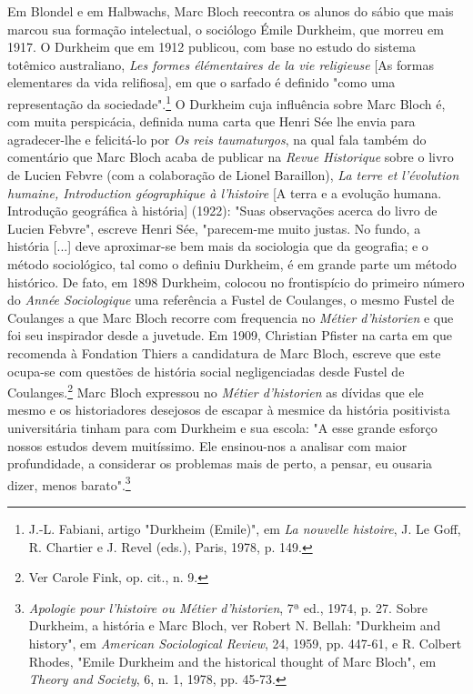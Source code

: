 \documentclass[a5paper]{book}
\begin{document}
Em Blondel e em Halbwachs, Marc Bloch reecontra os alunos do sábio que mais marcou sua formação intelectual, o sociólogo Émile Durkheim, que morreu em 1917. O Durkheim que em 1912 publicou, com base no estudo do sistema totêmico australiano, \textit{Les formes élémentaires de la vie religieuse} [As formas elementares da vida relifiosa], em que o sarfado é definido "como uma representação da sociedade".\footnote{J.-L. Fabiani, artigo "Durkheim (Emile)", em \textit{La nouvelle histoire}, J. Le Goff, R. Chartier e J. Revel (eds.), Paris, 1978, p. 149.} O Durkheim cuja influência sobre Marc Bloch é, com muita perspicácia, definida numa carta que Henri Sée lhe envia para agradecer-lhe e felicitá-lo por \textit{Os reis taumaturgos}, na qual fala também do comentário que Marc Bloch acaba de publicar na \textit{Revue Historique} sobre o livro de Lucien Febvre (com a colaboração de Lionel Baraillon), \textit{La terre et l'évolution humaine, Introduction géographique à l'histoire} [A terra e a evolução humana. Introdução geográfica à história] (1922): "Suas observações acerca do livro de Lucien Febvre", escreve Henri Sée, "parecem-me muito justas. No fundo, a história [...]
deve aproximar-se bem mais da sociologia que da geografia; e o método sociológico, tal como o definiu Durkheim, é em grande parte um método histórico. De fato, em 1898 Durkheim, colocou no frontispício do primeiro número do \textit{Année Sociologique} uma referência a Fustel de Coulanges, o mesmo Fustel de Coulanges a que Marc Bloch recorre com frequencia no \textit{Métier d'historien} e que foi seu inspirador desde a juvetude. Em 1909, Christian Pfister na carta em que recomenda à Fondation Thiers a candidatura de Marc Bloch, escreve que este ocupa-se com questões de história social negligenciadas desde Fustel de Coulanges.\footnote{Ver Carole Fink, op. cit., n. 9.} Marc Bloch expressou no \textit{Métier d'historien} as dívidas que ele mesmo e os historiadores desejosos de escapar à mesmice da história positivista universitária tinham para com Durkheim e sua escola: "A esse grande esforço nossos estudos devem muitíssimo. Ele ensinou-nos a analisar com maior profundidade, a considerar os problemas mais de perto, a pensar, eu ousaria dizer, menos barato".\footnote{\textit{Apologie pour l'histoire ou Métier d'historien}, 7ª ed., 1974, p. 27. Sobre Durkheim, a história e Marc Bloch, ver Robert N. Bellah: "Durkheim and history", em \textit{American Sociological Review}, 24, 1959, pp. 447-61, e R. Colbert Rhodes, "Emile Durkheim and the historical thought of Marc Bloch", em \textit{Theory and Society}, 6, n. 1, 1978, pp. 45-73.}
\end{document}
